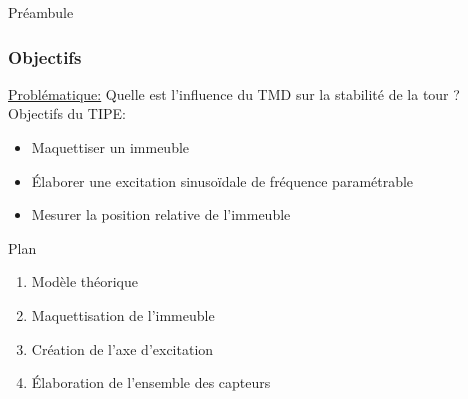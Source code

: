 \documentclass{beamer}
\begin{document}
	\begin{frame}{Préambule}
		\frametitle{Objectifs}
		\underline{Problématique:} Quelle est l'influence du TMD sur la stabilité de la tour ? 
		\vspace{12pt}
		\linebreak[3]Objectifs du TIPE:
		\begin{itemize}
			\item Maquettiser un immeuble
			\item Élaborer une excitation sinusoïdale de fréquence paramétrable
			\item Mesurer la position relative de l'immeuble
			
		\end{itemize}
		
	\end{frame}
	
	\begin{frame}{Plan}
		\begin{enumerate}
			\item Modèle théorique
			\item Maquettisation de l'immeuble
			\item Création de l'axe d'excitation
			\item Élaboration de l'ensemble des capteurs
		\end{enumerate}
	\end{frame}
\end{document}

